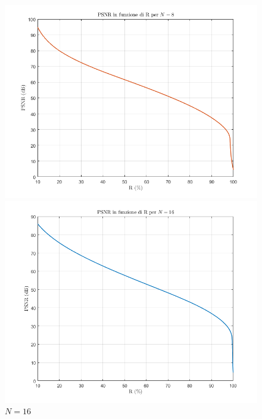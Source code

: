 \begin{figure}[H]
    \centering
    \begin{minipage}{.5\textwidth}
        \centering
	\includegraphics[width=\linewidth]{RIS_N8.png}
	\caption{$N=8$}
	\label{fig:ris8}
    \end{minipage}%
    \begin{minipage}{.5\textwidth}
        \centering
	\includegraphics[width=\linewidth]{RIS_N16.png}
	\caption{$N=16$}
	\label{fig:ris16}
    \end{minipage}
\end{figure}

